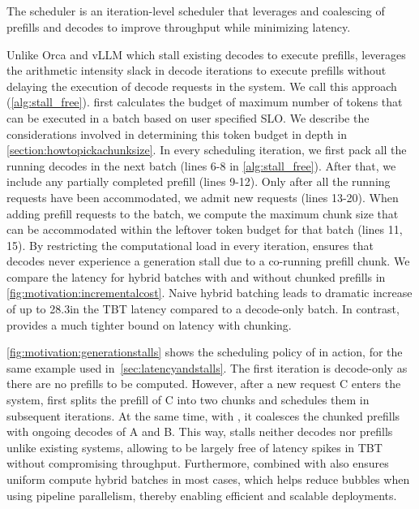 \subsection{\Hbatch}



The \sysname scheduler is an iteration-level scheduler that leverages \chunking and coalescing of prefills and decodes to improve throughput while minimizing latency.

Unlike Orca and vLLM which stall existing decodes to execute prefills, \sysname leverages the arithmetic intensity slack in decode iterations to execute prefills without delaying the execution of decode requests in the system. We call this approach \hbatch (\autoref{alg:stall_free}). \sysname first calculates the budget of maximum number of tokens that can be executed in a batch based on user specified SLO. We describe the considerations involved in determining this token budget in depth in \autoref{section:howtopickachunksize}. In every scheduling iteration, we first pack all the running decodes in the next batch (lines 6-8 in \autoref{alg:stall_free}). After that, we include any partially completed prefill (lines 9-12). Only after all the running requests have been accommodated, we admit new requests (lines 13-20). When adding prefill requests to the batch, we compute the maximum chunk size that can be accommodated within the leftover token budget for that batch (lines 11, 15). By restricting the computational load in every iteration, \hbatch ensures that decodes never experience a generation stall due to a co-running prefill chunk.  We compare the latency for hybrid batches with and without chunked prefills in \autoref{fig:motivation:incrementalcost}. Naive hybrid batching leads to dramatic increase of up to 28.3\myx in the TBT latency compared to a decode-only batch. In contrast, \sysname provides a much tighter bound on latency with chunking.

\autoref{fig:motivation:generationstalls} shows the scheduling policy of \sysname in action, for the same example used in~\autoref{sec:latencyandstalls}. The first iteration is decode-only as there are no prefills to be computed. However, after a new request C enters the system, \sysname first splits the prefill of C into two chunks and schedules them in subsequent iterations. At the same time, with \hbatch, it coalesces the chunked prefills with ongoing decodes of A and B. This way, \sysname stalls neither decodes nor prefills unlike existing systems, allowing \sysname to be largely free of latency spikes in TBT without compromising throughput. Furthermore, \hbatch combined with \chunking also ensures uniform compute hybrid batches in most cases, which helps reduce bubbles when using pipeline parallelism, thereby enabling efficient and scalable deployments.


